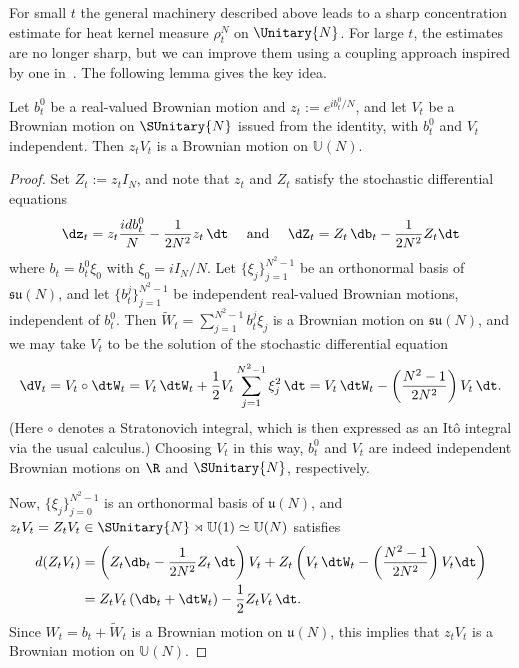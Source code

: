For small $t$ the general machinery described above leads to a sharp concentration estimate for heat kernel measure $\rho^N_t$ on $\Unitary{N}$. For large $t$, the estimates are no longer sharp, but we can improve them using a coupling approach inspired by one in~\cite{MM-ECP-2013}. The following lemma gives the key idea.

\begin{lemm}\label{l.couple}
Let $b^0_t$ be a real-valued Brownian motion and $z_t := e^{ib_t^0/N}$, and let $V_t$ be a Brownian motion on $\SUnitary{N}$ issued from the identity, with $b^0_t$ and $V_t$ independent. Then $z_tV_t$ is a Brownian motion on $\mathbb{U}(N)$.
\end{lemm}

\begin{proof}
Set $Z_t:=z_tI_N$, and note that $z_t$ and $Z_t$ satisfy the stochastic differential equations
\[
\dz_t = z_t \frac{idb_t^0}{N} - \frac{1}{2N^2}z_t\,\dt
\quad \text{ and } \quad \dZ_t = Z_t\,\db_t - \frac{1}{2N^2}Z_t \dt
\]
where $b_t =b_t^0\xi_0$ with $\xi_0=iI_N/N$. Let $\{\xi_j\}_{j=1}^{N^2-1}$ be an orthonormal basis of $\mathfrak{su}(N)$, and let $\{b_t^j\}_{j=1}^{N^2-1}$ be independent real-valued Brownian motions, independent of $b^0_t$. Then $\tilde{W}_t= \sum_{j=1}^{N^2-1} b_t^j \xi_j$ is a Brownian motion on $\mathfrak{su}(N)$, and we may take $V_t$ to be the solution of the stochastic differential equation
\[
\dV_t = V_t\circ \dtW_t = V_t\,\dtW_t + \frac{1}{2}V_t\sum_{j=1}^{N^2-1} \xi_j^2 \,\dt = V_t\,\dtW_t - \left(\frac{N^2-1}{2N^2}\right)V_t\, \dt.
\]
(Here $\circ$ denotes a Stratonovich integral, which is then expressed as an It\^o integral via the usual calculus.) Choosing $V_t$ in this way, $b^0_t$ and $V_t$ are indeed independent Brownian motions on $\R$ and $\SUnitary{N}$, respectively.

Now, $\{\xi_j\}_{j=0}^{N^2-1}$ is an orthonormal basis of $\mathfrak{u}(N)$, and $z_tV_t=Z_tV_t\in \SUnitary{N}\rtimes \mathbb{U}(1)\simeq \mathbb{U}(N)$ satisfies
\begin{align*}
d(Z_tV_t) &= \left(Z_t \db_t - \frac{1}{2N^2} Z_t\,\dt\right)V_t + Z_t\left(V_t\,\dtW_t - \left(\frac{N^2-1}{2N^2}\right)V_t\dt\right)
\\
&= Z_tV_t\,(\db_t +\dtW_t) - \frac{1}{2}Z_tV_t\,\dt.
\end{align*}
Since $W_t=b_t+\tilde{W}_t$ is a Brownian motion on $\mathfrak{u}(N)$, this implies that $z_tV_t$ is a Brownian motion on $\mathbb{U}(N)$.
\end{proof}

